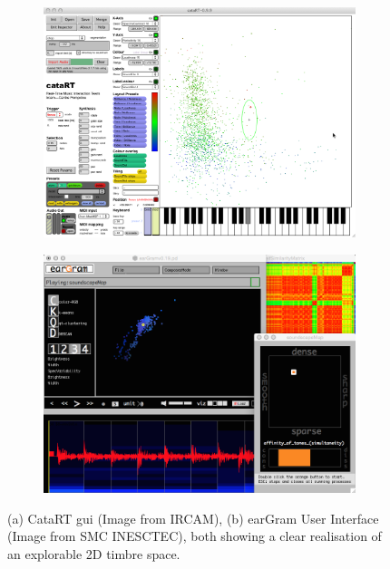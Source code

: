 \begin{figure}
\centering
\begin{subfigure}[b]{0.9\textwidth}
   \includegraphics[width=1\linewidth]{ch04_sota/figures/catart.png}
   \caption{}
   \label{fig:catart} 
\end{subfigure}

\begin{subfigure}[b]{0.9\textwidth}
   \includegraphics[width=1\linewidth]{ch04_sota/figures/eargram.png}
   \caption{}
   \label{fig:eargram}
\end{subfigure}

\caption[CataRT and Eargram Interfaces]{(a) CataRT \acrshort{gui} (Image from IRCAM), (b) earGram User Interface (Image from  SMC INESCTEC), both showing a clear realisation of an explorable 2D timbre space.}
\end{figure}


